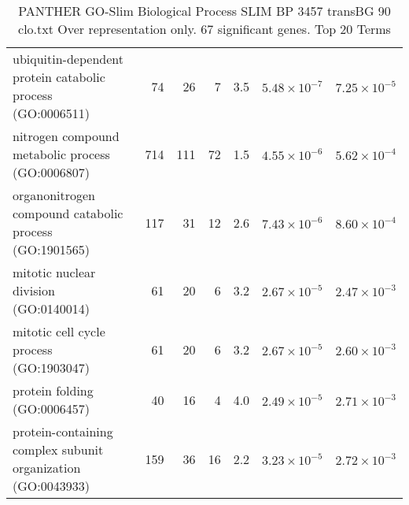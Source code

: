 \begin{table}[ht]
\begin{adjustbox}{width=\textwidth}
\begin{tabular}{lrrrrrr}
  ubiquitin-dependent protein catabolic process (GO:0006511) & 74 & 26 & 7 & 3.5 & $5.48 \times 10^{-7}$ & $7.25 \times 10^{-5}$ \\ 
  nitrogen compound metabolic process (GO:0006807) & 714 & 111 & 72 & 1.5 & $4.55 \times 10^{-6}$ & $5.62 \times 10^{-4}$ \\ 
  organonitrogen compound catabolic process (GO:1901565) & 117 & 31 & 12 & 2.6 & $7.43 \times 10^{-6}$ & $8.60 \times 10^{-4}$ \\ 
  mitotic nuclear division (GO:0140014) & 61 & 20 & 6 & 3.2 & $2.67 \times 10^{-5}$ & $2.47 \times 10^{-3}$ \\ 
  mitotic cell cycle process (GO:1903047) & 61 & 20 & 6 & 3.2 & $2.67 \times 10^{-5}$ & $2.60 \times 10^{-3}$ \\ 
  protein folding (GO:0006457) & 40 & 16 & 4 & 4.0 & $2.49 \times 10^{-5}$ & $2.71 \times 10^{-3}$ \\ 
  protein-containing complex subunit organization (GO:0043933) & 159 & 36 & 16 & 2.2 & $3.23 \times 10^{-5}$ & $2.72 \times 10^{-3}$ \\ 
   \hline
\end{tabular}
\end{adjustbox}
\caption{PANTHER GO-Slim Biological Process SLIM BP 3457 transBG 90 clo.txt Over representation only. 67 significant genes. Top 20 Terms} 
\label{tab:PANTHER GO-Slim Biological Process SLIM BP 3457 transBG 90 clo.txt Over representation only. 67 significant genes. Top 20 Terms}
\end{table}




